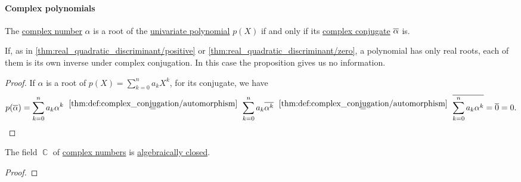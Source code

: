 \paragraph{Complex polynomials}

\begin{proposition}\label{thm:complex_conjugation_of_roots}
  The \hyperref[def:complex_numbers]{complex number} \( \alpha \) is a root of the \hyperref[def:univariate_polynomial]{univariate polynomial} \( p(X) \) if and only if its \hyperref[def:complex_conjugation]{complex conjugate} \( \oline \alpha \) is.
\end{proposition}
\begin{comments}
  \item If, as in \cref{thm:real_quadratic_discriminant/positive} or \cref{thm:real_quadratic_discriminant/zero}, a polynomial has only real roots, each of them is its own inverse under complex conjugation. In this case the proposition gives us no information.
\end{comments}
\begin{proof}
  If \( \alpha \) is a root of \( p(X) = \sum_{k=0}^n a_k X^k \), for its conjugate, we have
  \begin{equation*}
    p(\oline \alpha)
    =
    \sum_{k=0}^n a_k \alpha^k
    \reloset {\ref{thm:def:complex_conjugation/automorphism}} =
    \sum_{k=0}^n a_k \oline{\alpha^k}
    \reloset {\ref{thm:def:complex_conjugation/automorphism}} =
    \oline{\sum_{k=0}^n a_k \alpha^k}
    =
    \oline 0
    =
    0.
  \end{equation*}
\end{proof}

\begin{theorem}\label{thm:fundamental_theorem_of_algebra}
  The field \( \BbbC \) of \hyperref[def:complex_numbers]{complex numbers} is \hyperref[def:algebraically_closed_field]{algebraically closed}.
\end{theorem}
\begin{proof}
\end{proof}
